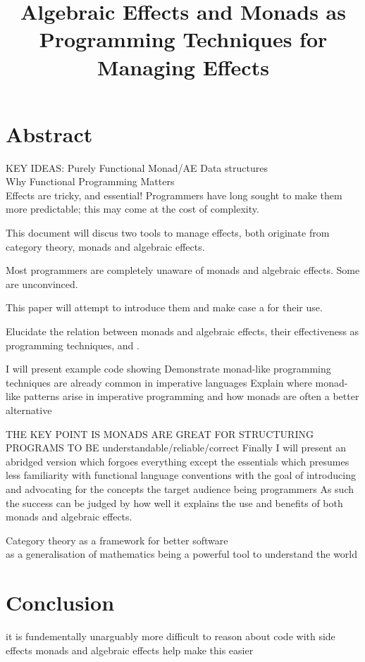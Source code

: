 \documentclass[a4paper,10pt]{article}
\title{Algebraic Effects and Monads as Programming Techniques for Managing Effects}
\theoremstyle{definition}
\begin{document}
\section{Abstract}

KEY IDEAS:
Purely Functional Monad/AE Data structures\\
Why Functional Programming Matters\\

Effects are tricky, and essential!
Programmers have long sought to make them more predictable;
this may come at the cost of complexity.

This document will discus two tools to manage effects,
both originate from category theory,
monads and algebraic effects.

Most programmers are completely unaware of monads and algebraic effects.
Some are unconvinced.

This paper will attempt to introduce them and make case a for their use.

Elucidate the relation between monads and algebraic effects,
their effectiveness as programming techniques,
and .


I will present example code showing
Demonstrate monad-like programming techniques are already common in imperative languages
Explain where monad-like patterns arise in imperative programming and how monads are often a better alternative

THE KEY POINT IS MONADS ARE GREAT FOR STRUCTURING PROGRAMS TO BE understandable/reliable/correct
Finally I will present an abridged version which forgoes everything except the essentials
which presumes less familiarity with functional language conventions
with the goal of introducing and advocating for the concepts
the target audience being programmers
As such the success can be judged by how well it explains the use and benefits of both monads and algebraic effects.

Category theory as a framework for better software\\
as a generalisation of mathematics being a powerful tool to understand the world\\


\pagebreak
\tableofcontents

\pagebreak


\pagebreak


\pagebreak


\pagebreak


\pagebreak


\pagebreak
\section{Conclusion}
it is fundementally unarguably more difficult to reason about code with side effects
monads and algebraic effects help make this easier

\pagebreak
\appendix



\pagebreak


\end{document}
